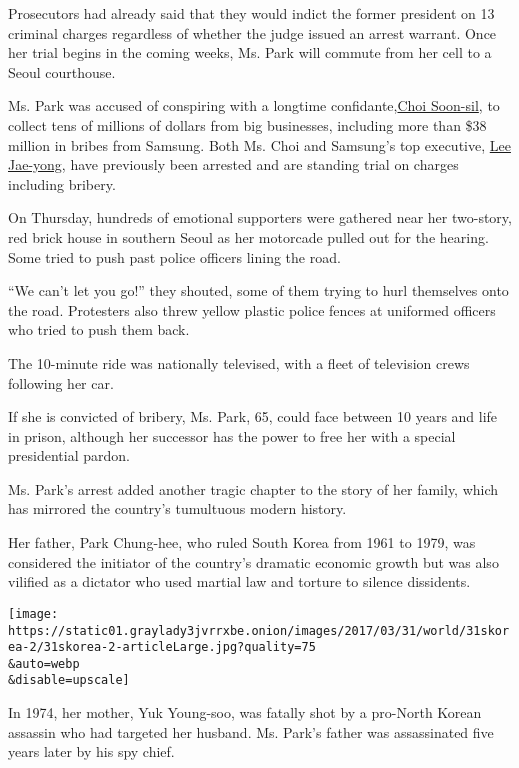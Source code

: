 Prosecutors had already said that they would indict the former president
on 13 criminal charges regardless of whether the judge issued an arrest
warrant. Once her trial begins in the coming weeks, Ms. Park will
commute from her cell to a Seoul courthouse.

Ms. Park was accused of conspiring with a longtime
confidante,\href{https://www.nytimes3xbfgragh.onion/2016/11/06/world/asia/south-koreans-ashamed-over-les-secretive-adviser.html}{Choi
Soon-sil}, to collect tens of millions of dollars from big businesses,
including more than \$38 million in bribes from Samsung. Both Ms. Choi
and Samsung's top executive,
\href{https://www.nytimes3xbfgragh.onion/2017/02/17/business/samsung-heir-arrested-south-korea.html}{Lee
Jae-yong}, have previously been arrested and are standing trial on
charges including bribery.

On Thursday, hundreds of emotional supporters were gathered near her
two-story, red brick house in southern Seoul as her motorcade pulled out
for the hearing. Some tried to push past police officers lining the
road.

``We can't let you go!'' they shouted, some of them trying to hurl
themselves onto the road. Protesters also threw yellow plastic police
fences at uniformed officers who tried to push them back.

The 10-minute ride was nationally televised, with a fleet of television
crews following her car.

If she is convicted of bribery, Ms. Park, 65, could face between 10
years and life in prison, although her successor has the power to free
her with a special presidential pardon.

Ms. Park's arrest added another tragic chapter to the story of her
family, which has mirrored the country's tumultuous modern history.

Her father, Park Chung-hee, who ruled South Korea from 1961 to 1979, was
considered the initiator of the country's dramatic economic growth but
was also vilified as a dictator who used martial law and torture to
silence dissidents.

\texttt{[image: https://static01.graylady3jvrrxbe.onion/images/2017/03/31/world/31skorea-2/31skorea-2-articleLarge.jpg?quality=75\\\&auto=webp\\\&disable=upscale]}

In 1974, her mother, Yuk Young-soo, was fatally shot by a pro-North
Korean assassin who had targeted her husband. Ms. Park's father was
assassinated five years later by his spy chief.

